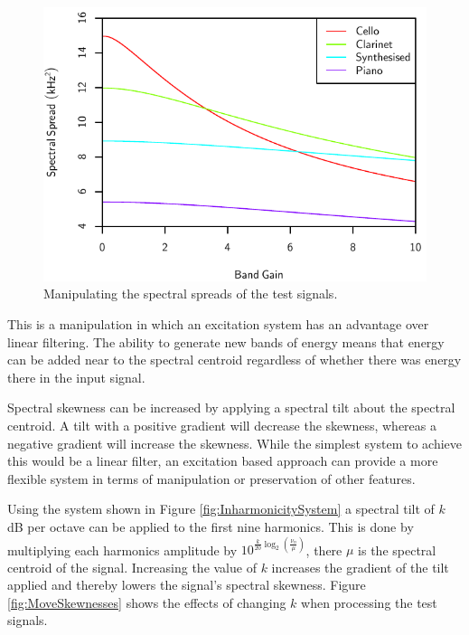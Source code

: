 			\begin{figure}[h!]
				\centering
				\includegraphics{chapter6/Images/MoveSpreads.pdf}
				\caption{Manipulating the spectral spreads of the test signals.}
				\label{fig:MoveSpreads}
			\end{figure}

			This is a manipulation in which an excitation system has an advantage over linear filtering. The
			ability to generate new bands of energy means that energy can be added near to the spectral
			centroid regardless of whether there was energy there in the input signal.

			Spectral skewness can be increased by applying a spectral tilt about the spectral centroid. A tilt
			with a positive gradient will decrease the skewness, whereas a negative gradient will increase the
			skewness. While the simplest system to achieve this would be a linear filter, an excitation based
			approach can provide a more flexible system in terms of manipulation or preservation of other
			features.

			Using the system shown in Figure \ref{fig:InharmonicitySystem} a spectral tilt of $k$ dB per octave
			can be applied to the first nine harmonics. This is done by multiplying each harmonics amplitude by
			$10^{\frac{k}{20}\log_{2} \left( \frac{\nu_{n}}{\mu} \right)}$, there $\mu$ is the spectral
			centroid of the signal. Increasing the value of $k$ increases the gradient of the tilt applied and
			thereby lowers the signal's spectral skewness. Figure \ref{fig:MoveSkewnesses} shows the effects of
			changing $k$ when processing the test signals.


